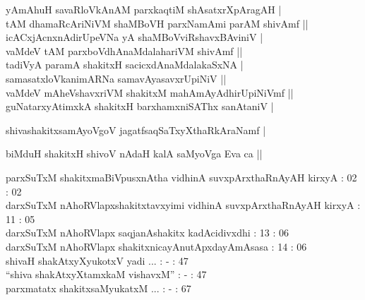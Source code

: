 \begin{entry}
\begin{shl}
yAmAhuH savaRloVkAnAM parxkaqtiM shAsatxrXpAragAH |\\
tAM dhamaRcAriNiVM shaMBoVH parxNamAmi parAM shivAmf ||\\
icACxjAcnxnAdirUpeVNa yA shaMBoVviRshavxBAviniV |\\
vaMdeV tAM parxboVdhAnaMdalahariVM shivAmf ||\\
tadiVyA paramA shakitxH sacicxdAnaMdalakaSxNA |\\
samasatxloVkanimARNa samavAyasavxrUpiNiV ||\\
vaMdeV mAheVshavxriVM shakitxM mahAmAyAdhirUpiNiVmf ||\\
guNatarxyAtimxkA shakitxH barxhamxniSAThx sanAtaniV |
\end{shl}
\begin{shl}
shivashakitxsamAyoVgoV jagatfsaqSaTxyXthaRkAraNamf |
\end{shl}
\begin{shl}
biMduH shakitxH shivoV nAdaH kalA saMyoVga Eva ca ||
\end{shl}
\gl{}
\begin{shl}
parxSuTxM shakitxmaBiVpusxnAtha vidhinA suvxpArxthaRnAyAH kirxyA : 02 : 02\\
darxSuTxM nAhoRVlapxshakitxtavxyimi vidhinA suvxpArxthaRnAyAH kirxyA : 11 : 05\\
darxSuTxM nAhoRVlapx saqjanAshakitx kadAcidivxdhi : 13 : 06\\
darxSuTxM nAhoRVlapx shakitxnicayAnutApxdayAmAsasa : 14 : 06\\
shivaH shakAtxyXyukotxV yadi ... : - : 47\\
``shiva shakAtxyXtamxkaM vishavxM'' : - : 47\\
parxmatatx shakitxsaMyukatxM ... : - : 67 
\end{shl}
\gl{}

\end{entry}
